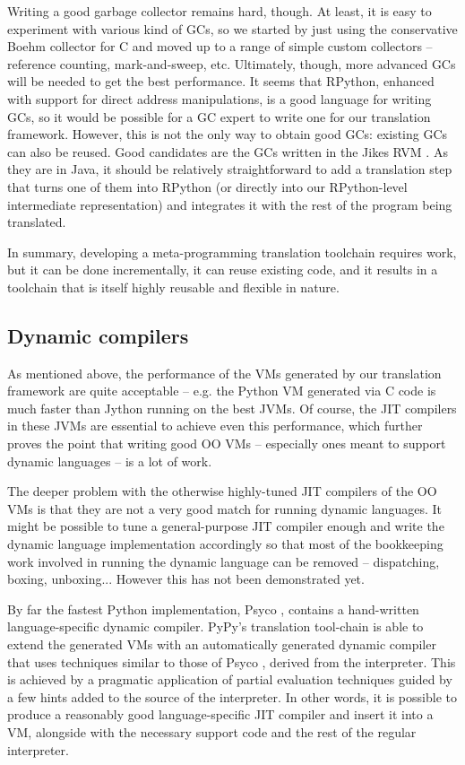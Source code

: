\documentclass{llncs}
\begin{document}
Writing a good garbage collector remains hard, though.  At least, it is
easy to experiment with various kind of GCs, so we started by just using
the conservative Boehm \cite{Boehm} collector for C and moved up to a
range of simple custom collectors -- reference counting, mark-and-sweep,
etc.  Ultimately, though, more advanced GCs will be needed to get the
best performance.  It seems that RPython, enhanced with support for
direct address manipulations, is a good language for writing GCs, so it
would be possible for a GC expert to write one for our translation
framework.  However, this is not the only way to obtain good GCs:
existing GCs can also be reused.  Good candidates are the GCs written in
the Jikes RVM \cite{JikesGC}.  As they are in Java, it should be
relatively straightforward to add a translation step that turns one of
them into RPython (or directly into our RPython-level intermediate
representation) and integrates it with the rest of the program being
translated.

In summary, developing a meta-programming translation toolchain requires
work, but it can be done incrementally, it can reuse existing code, and
it results in a toolchain that is itself highly reusable and flexible in
nature.

\subsection{Dynamic compilers}
\label{subsect:dynamic_compilers}

As mentioned above, the performance of the VMs generated by our
translation framework are quite acceptable -- e.g. the Python VM
generated via C code is much faster than Jython running on the best
JVMs.  Of course, the JIT compilers in these JVMs are essential to
achieve even this performance, which further proves the point that
writing good OO VMs -- especially ones meant to support dynamic
languages -- is a lot of work.

The deeper problem with the otherwise highly-tuned JIT compilers of the
OO VMs is that they are not a very good match for running dynamic
languages.  It might be possible to tune a general-purpose JIT compiler
enough and write the dynamic language implementation accordingly so
that most of the bookkeeping work involved in running the dynamic
language can be removed -- dispatching, boxing, unboxing...  However
this has not been demonstrated yet.

By far the fastest Python implementation, Psyco \cite{psyco-software}, contains a
hand-written language-specific dynamic compiler.  PyPy's translation
tool-chain is able to extend the generated VMs with an automatically
generated dynamic compiler that uses techniques similar to those of Psyco
\cite{Psyco-paper}, derived from the
interpreter.  This is achieved by a pragmatic application of partial
evaluation techniques guided by a few hints added to the source of the
interpreter.  In other words, it is possible to produce a reasonably
good language-specific JIT compiler and insert it into a VM, alongside
with the necessary support code and the rest of the regular interpreter.
\end{document}
